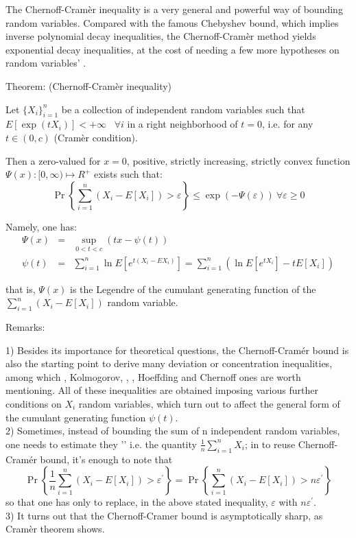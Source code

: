 \documentclass{article}
\begin{document}
The Chernoff-Cram\`{e}r inequality is a very general and powerful way of bounding random variables. Compared with the famous Chebyshev bound, which implies inverse polynomial decay inequalities, the Chernoff-Cram\`{e}r method yields exponential decay inequalities, at the cost of  needing a few more
hypotheses on random variables' .


Theorem: (Chernoff-Cram\`{e}r inequality)

Let $\{X_{i}\}_{i=1}^{n}$ be a collection of independent random
variables such that $E[\exp \left( tX_{i}\right) ]<+\infty $ \ $\forall i$ in a right neighborhood of $t=0$, i.e. for any $t\in(0,c)$ (Cram\`{e}r condition).

Then a zero-valued for $x=0$, positive, strictly increasing, strictly convex function $\Psi (x):[0,\infty )\mapsto R^{+}$ exists
such that: \\
\[
\Pr\left\{ \sum_{i=1}^{n}\left( X_{i}-E[X_{i}]\right) >\varepsilon \right\}
\leq \exp \left( -\Psi (\varepsilon )\right) \ \forall \varepsilon \geq 0
\]

Namely, one has:
\begin{eqnarray*}
\Psi (x) &=&\sup_{0 < t < c}\left( tx -\psi (t)\right)  \\
\psi (t) &=&\sum_{i=1}^{n}\ln E\left[ e^{t\left( X_{i}-EX_{i}\right) }\right]
=\sum_{i=1}^{n}\left(\ln E\left[ e^{tX_{i}}\right] -tE\left[ X_{i}\right]\right)
\end{eqnarray*}

that is, $\Psi (x)$ is the Legendre  of the cumulant generating function of the $\sum_{i=1}^{n}\left( X_{i}-E[X_{i}]\right)$ random variable.

Remarks:

1) Besides its importance for theoretical questions, the Chernoff-Cram\'{e}r bound is also the starting point to derive many deviation
or concentration inequalities, among which , Kolmogorov, , ,
Hoeffding and Chernoff ones are worth mentioning. All of these
inequalities are obtained imposing various further conditions on $X_{i}$ random variables, which turn out to affect the general form of the cumulant generating function $\psi(t)$. \\
2) Sometimes, instead of bounding the sum of n independent random variables, one needs to estimate they '' i.e. the quantity $\frac{1}{n}\sum_{i=1}^{n}X_i$; in  to reuse Chernoff-Cram\'{e}r bound, it's enough to note that
\[
\Pr\left\{\frac{1}{n}\sum_{i=1}^{n}\left( X_{i}-E[X_{i}]\right) >\varepsilon^{\prime}\right\}=\Pr\left\{\sum_{i=1}^{n}\left( X_{i}-E[X_{i}]\right) >n\varepsilon^{\prime}\right\}
\]
so that one has only to replace, in the above stated inequality, $\varepsilon$ with $n\varepsilon^{\prime}$.
\\
3) It turns out that the Chernoff-Cramer bound is asymptotically sharp, as Cramèr  theorem shows.
\end{document}
